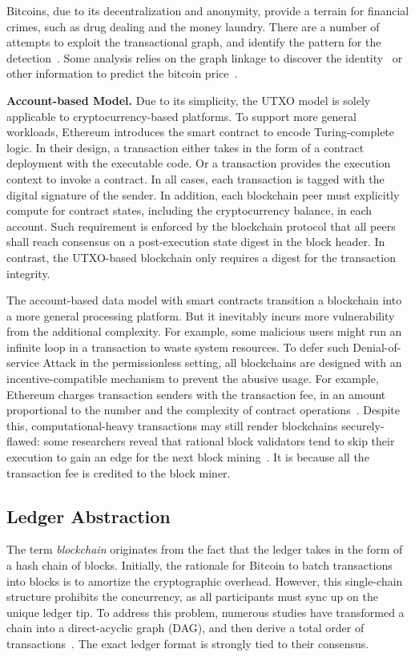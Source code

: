 Bitcoins, due to its decentralization and anonymity, provide a terrain for financial crimes, such as drug dealing and the money laundry. There are a number of attempts to exploit the transactional graph, and identify the pattern for the detection~\cite{fleder2015bitcoin,ron2013quantitative,weber2019anti}. 
Some analysis relies on the graph linkage to discover the identity~\cite{ober2013structure,gaihre2018bitcoin,moser2013anonymity} or other information to predict the bitcoin price~\cite{greaves2015using}. 

\textbf{Account-based Model.}
Due to its simplicity, the UTXO model is solely applicable to cryptocurrency-based platforms. 
To support more general workloads, Ethereum introduces the smart contract to encode Turing-complete logic. 
In their design, a transaction either takes in the form of a contract deployment with the executable code. 
Or a transaction provides the execution context to invoke a contract. 
In all cases, each transaction is tagged with the digital signature of the sender. 
In addition, each blockchain peer must explicitly compute for contract states, including the cryptocurrency balance, in each account. 
Such requirement is enforced by the blockchain protocol that all peers shall reach consensus on a post-execution state digest in the block header. 
In contrast, the UTXO-based blockchain only requires a digest for the transaction integrity.

The account-based data model with smart contracts transition a blockchain into a more general processing platform. 
But it inevitably incurs more vulnerability from the additional complexity. 
For example, some malicious users might run an infinite loop in a transaction to waste system resources. 
To defer such Denial-of-service Attack in the permissionless setting, all blockchains are designed with an incentive-compatible mechanism to prevent the abusive usage. 
For example, Ethereum charges transaction senders with the transaction fee, in an amount proportional to the number and the complexity of contract operations~\cite{wood2014ethereum}.
Despite this, computational-heavy transactions may still render blockchains securely-flawed: some researchers reveal that rational block validators tend to skip their execution to gain an edge for the next block mining~\cite{luu2015demystifying}.
It is because all the transaction fee is credited to the block miner. 

\subsection{Ledger Abstraction}
The term \textit{blockchain} originates from the fact that the ledger takes in the form of a hash chain of blocks. 
Initially, the rationale for Bitcoin to batch transactions into blocks is to amortize the cryptographic overhead.
However, this single-chain structure prohibits the concurrency, as all participants must sync up on the unique ledger tip. 
To address this problem, numerous studies have transformed a chain into a direct-acyclic graph (DAG), and then derive a total order of transactions~\cite{sompolinsky2015secure,kiayias2017trees,li2018scaling,srivastava2018phantom}. 
The exact ledger format is strongly tied to their consensus. 

